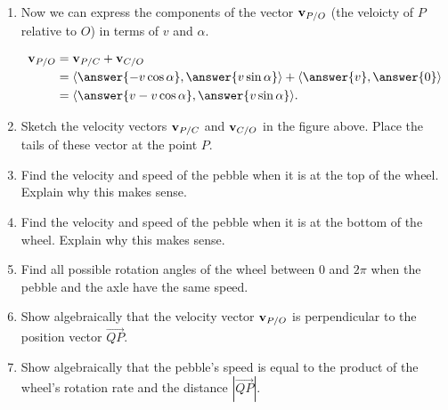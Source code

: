 \documentclass{ximera}
\begin{document}
\begin{question}
\begin{enumerate}

\item Now we can express the components of the vector ${\bf v}_{P/O}$ (the veloicty of $P$ relative to $O$) in terms of $v$ and $\alpha$.
 
\begin{align*}
    {\bf v}_{P/O}  &= {\bf v}_{P/C} + {\bf v}_{C/O} \\
                          &= \langle  \answer{-v \cos \alpha} , \answer{v \sin \alpha} \rangle  + \langle \answer{v},\answer{0} \rangle \\
                           &=\langle \answer{v-v \cos \alpha} , \answer{v \sin \alpha} \rangle.
\end{align*}

\item Sketch the velocity vectors ${\bf v}_{P/C}$ and ${\bf v}_{C/O}$ in the figure above. Place the tails of these vector at the point $P$. 

\item Find the velocity and speed of the pebble when it is at the top of the wheel. Explain why this makes sense.

\item Find the velocity and speed of the pebble when it is at the bottom of the wheel. Explain why this makes sense.

\item Find all possible rotation angles of the wheel between $0$ and $2\pi$ when the pebble and the axle have the same speed.


\item Show algebraically that the velocity vector ${\bf v}_{P/O}$ is perpendicular to the position vector $\overrightarrow{QP}$.

\item Show algebraically that the pebble's speed is equal to the product of the wheel's rotation rate and the distance $|\overrightarrow{QP}|$.





\end{enumerate}
\end{question}
\end{document}
